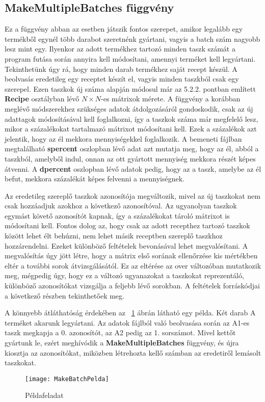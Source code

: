 \subsection{MakeMultipleBatches függvény}
Ez a függvény abban az esetben játszik fontos szerepet, amikor legalább egy termékből egynél több darabot szeretnénk gyártani, vagyis a batch szám nagyobb lesz mint egy.
Ilyenkor az adott termékhez tartozó minden taszk számát a program futása során annyira kell módosítani, amennyi terméket kell legyártani.
Tekinthetünk úgy rá, hogy minden darab termékhez saját recept készül.
A beolvasás eredetileg egy receptet készít el, vagyis minden taszkból csak egy szerepel.
Ezen taszkok új száma alapján módosul már az 5.2.2. pontban említett \textbf{Recipe} osztályban lévő $N\times N$-es mátrixok mérete.
A függvény a korábban meglévő módszerekhez szükséges adatok átdolgozásáról gondoskodik, csak az új adattagok módosításával kell foglalkozni, így a taszkok száma már megfelelő lesz, mikor a százalékokat tartalmazó mátrixot módosítani kell.
Ezek a százalékok azt jelentik, hogy az él mekkora mennyiségekkel foglalkozik.
A bemeneti fájlban megtalálható \textbf{s\textunderscore percent} oszlopban lévő adat azt mutatja meg, hogy az él, abból a taszkból, amelyből indul, onnan az ott gyártott mennyiség mekkora részét képes átvenni.
A \textbf{d\textunderscore percent} oszlopban lévő adatok pedig, hogy az a taszk, amelybe az él befut, mekkora százalékát képes felvenni a mennyiségnek. 

Az eredetileg szereplő taszkok azonosítója megváltozik, mivel az új taszkokat nem csak hozzáadjuk azokhoz a következő azonosítóval.
Az ugyanolyan taszkok egymást követő azonosítót kapnak, így a százalékokat tároló mátrixot is módosítani kell.
Fontos dolog az, hogy csak az adott recepthez tartozó taszkok között lehet élt behúzni, nem lehet másik receptben szereplő taszkhoz hozzárendelni.
Ezeket különböző feltételek bevonásával lehet megvalósítani.
A megvalósítás úgy jött létre, hogy a mátrix  első sorának ellenőrzése kis mértékben eltér a további sorok átvizsgálásától.
Ez az eltérése az over változóban mutatkozik meg, mégpedig úgy, hogy ez a változó ugyanazokat a taszkokat reprezentáló, különböző azonosítókat vizsgálja a feljebb lévő sorokban.
A feltételek forráskódjai a következő részben tekinthetőek meg.

A könnyebb átláthatóság érdekében az ~\ref{MakeBatchPelda} ábrán látható egy példa.
Két darab A terméket akarunk legyártani.
Az adatok fájlból való beolvasása során az A1-es taszk megkapja a 0. azonosítót, az A2 pedig az 1. sorszámot.
Mivel kettőt gyártunk le, ezért meghívódik a \textbf{MakeMultipleBatches} függvény, és újra kiosztja az azonosítókat, miközben létrehozta kellő számban az eredetiről lemásolt taszkokat. 
\begin{figure}[H]
\begin{center}
\texttt{[image: MakeBatchPelda]}
\caption{Példafeladat}
\label{MakeBatchPelda}
\end{center}
\end{figure}

